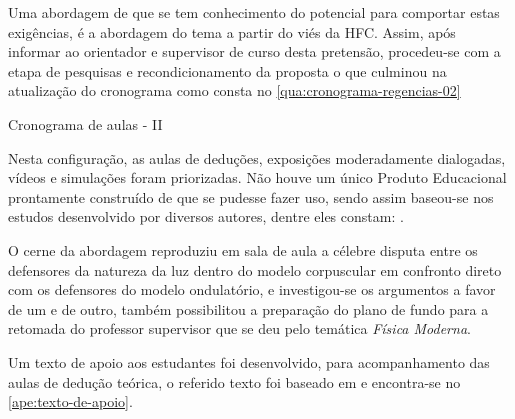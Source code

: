  Uma abordagem de que se tem conhecimento do potencial para comportar estas exigências, é a abordagem do tema a partir do viés da \ac{HFC}. Assim, após informar ao orientador e supervisor de curso desta pretensão, procedeu-se com a etapa de pesquisas e recondicionamento da proposta o que culminou na atualização do cronograma como consta no \autoref{qua:cronograma-regencias-02} 

\vspace{15pt}
\begin{quadro}[!ht]
    \centering
    \caption{Cronograma de aulas - II}
    \label{qua:cronograma-regencias-02}
\end{quadro}
\vspace{15pt}

Nesta configuração, as aulas de deduções, exposições moderadamente dialogadas, vídeos e simulações foram priorizadas. Não houve um único Produto Educacional prontamente construído de que se pudesse fazer uso, sendo assim baseou-se nos estudos desenvolvido por diversos autores, dentre eles constam: \cite{FABIO:2009,FELIPHE:2019,PEDUZZI:2022,FORATO:2011,FAOBIO:2007}.

O cerne da abordagem reproduziu em sala de aula a célebre disputa entre os defensores da natureza da luz dentro do modelo corpuscular em confronto direto com os defensores do modelo ondulatório, e investigou-se os argumentos a favor de um e de outro, também possibilitou a preparação do plano de fundo para a retomada do professor supervisor que se deu pelo temática \emph{Física Moderna}.

Um texto de apoio aos estudantes foi desenvolvido, para acompanhamento das aulas de dedução teórica, o referido texto foi baseado em \cite{NUSSENZVEIG41997,HALLIDAY42008,HALLIDAY22008,ZEMANSKY42010,NUSSENZVEIG31997,PEDUZZI:2022} e encontra-se no \autoref{ape:texto-de-apoio}.

